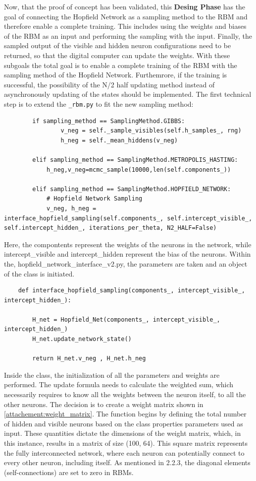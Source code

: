 Now, that the proof of concept has been validated, this \textbf{Desing Phase} has the goal of connecting the 
Hopfield Network as a sampling method to the \ac{RBM} and therefore enable a complete training. 
This includes using the weights and biases of the \ac{RBM} as an input and performing the sampling with the input.
Finally, the sampled output of the visible and hidden neuron configurations need to be returned, so that the digital computer can update the weights.
With these subgoals the total goal is to enable a complete training of the \ac{RBM} with the sampling method of the Hopfield Network. 
Furthemrore, if the training is successful, the possibility of the N/2 half updating method instead of asynchronously updating of the states should be implemented.
The first technical step is to extend the \texttt{\_rbm.py} to fit the new sampling method: 
\begin{lstlisting}
        if sampling_method == SamplingMethod.GIBBS:
                v_neg = self._sample_visibles(self.h_samples_, rng)
                h_neg = self._mean_hiddens(v_neg)

        elif sampling_method == SamplingMethod.METROPOLIS_HASTING:
            h_neg,v_neg=mcmc_sample(10000,len(self.components_))

        elif sampling_method == SamplingMethod.HOPFIELD_NETWORK:  
            # Hopfield Network Sampling
            v_neg, h_neg = interface_hopfield_sampling(self.components_, self.intercept_visible_, self.intercept_hidden_, iterations_per_theta, N2_HALF=False)    
\end{lstlisting}
Here, the compontents represent the weights of the neurons in the network, while intercept\_visible and intercept\_hidden represent the bias of the neurons. 
Within the, hopfield\_network\_interface\_v2.py, the parameters are taken and an object of the class is initiated. 

\begin{lstlisting}
    def interface_hopfield_sampling(components_, intercept_visible_, intercept_hidden_):
   
        H_net = Hopfield_Net(components_, intercept_visible_, intercept_hidden_)
        H_net.update_network_state()
        
        return H_net.v_neg , H_net.h_neg
\end{lstlisting}
Inside the class, the initialization of all the parameters and weights are performed. 
The update formula needs to calculate the weighted sum, which necessarily requires to know all the weights between the neuron itself, to all the other neurons. 
The decision is to create a weight matrix shown in \ref{attachement:weight_matrix}. 
The function begins by defining the total number of hidden and visible neurons based on the class properties parameters used as input.
These quantities dictate the dimensions of the weight matrix, which, in this instance, results in a matrix of size (100, 64).
This square matrix represents the fully interconnected network, where each neuron can potentially connect to every other neuron, including itself.
As mentioned in 2.2.3, the diagonal elements (self-connections) are set to zero in \ac{RBM}s.

